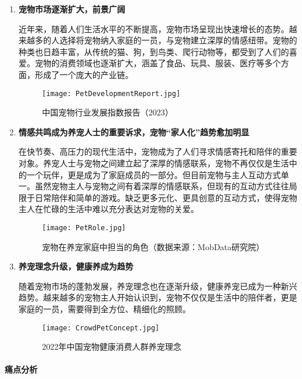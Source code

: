 \begin{enumerate}
    \item \textbf{宠物市场逐渐扩大，前景广阔}

    近年来，随着人们生活水平的不断提高，宠物市场呈现出快速增长的态势。越来越多的人选择将宠物纳入家庭的一员，与宠物建立深厚的情感纽带。宠物的种类也日趋丰富，从传统的猫、狗，到鸟类、爬行动物等，都受到了人们的喜爱。宠物的消费领域也逐渐扩大，涵盖了食品、玩具、服装、医疗等多个方面，形成了一个庞大的产业链。
    
	\begin{figure}[htbp]
		\centering
		\texttt{[image: PetDevelopmentReport.jpg]}
		\caption{中国宠物行业发展指数报告（2023）}
		\label{PetDevelopmentReport}
	\end{figure}

    \item \textbf{情感共鸣成为养宠人士的重要诉求，宠物“家人化”趋势愈加明显}
    
    在快节奏、高压力的现代生活中，宠物成为了人们寻求情感寄托和陪伴的重要对象。养宠人士与宠物之间建立起了深厚的情感联系，宠物不再仅仅是生活中的一个玩伴，更是成为了家庭成员的一部分。但目前宠物与主人互动方式单一。虽然宠物主人与宠物之间有着深厚的情感联系，但现有的互动方式往往局限于日常陪伴和简单的游戏。缺乏更多元化、更具创意的互动方式，使得宠物主人在忙碌的生活中难以充分表达对宠物的关爱。

	\begin{figure}[htbp]
	\centering
	\texttt{[image: PetRole.jpg]}
	\caption{宠物在养宠家庭中担当的角色（数据来源：MobData研究院）}
	\label{PetRole}
	\end{figure} 
	
    \item \textbf{养宠理念升级，健康养成为趋势}
    
    随着宠物市场的蓬勃发展，养宠理念也在逐渐升级，健康养宠已成为一种新兴趋势。越来越多的宠物主人开始认识到，宠物不仅仅是生活中的陪伴者，更是家庭的一员，需要得到全方位、精细化的照顾。
 
 	\begin{figure}[htbp]
 	\centering
 	\texttt{[image: CrowdPetConcept.jpg]}
 	\caption{2022年中国宠物健康消费人群养宠理念}
 	\label{CrowdPetConcept}
	\end{figure}

\end{enumerate}

\paragraph{痛点分析}


